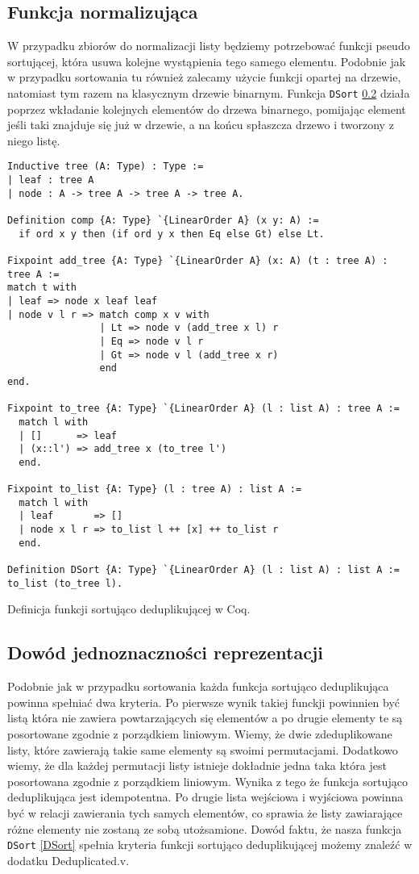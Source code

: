 \subsection{Funkcja normalizująca}
W przypadku zbiorów do normalizacji listy będziemy potrzebować funkcji pseudo sortującej, która usuwa kolejne wystąpienia tego samego elementu. Podobnie jak w przypadku sortowania tu również zalecamy użycie funkcji opartej na drzewie, natomiast tym razem na klasycznym drzewie binarnym.
Funkcja \texttt{DSort} \ref{} działa poprzez wkładanie kolejnych elementów do drzewa binarnego, pomijając element jeśli taki znajduje się już w drzewie, a na końcu spłaszcza drzewo i tworzony z niego listę. 
\begin{code}
\begin{verbatim}
Inductive tree (A: Type) : Type :=
| leaf : tree A
| node : A -> tree A -> tree A -> tree A.

Definition comp {A: Type} `{LinearOrder A} (x y: A) := 
  if ord x y then (if ord y x then Eq else Gt) else Lt.

Fixpoint add_tree {A: Type} `{LinearOrder A} (x: A) (t : tree A) : tree A :=
match t with
| leaf => node x leaf leaf
| node v l r => match comp x v with
                | Lt => node v (add_tree x l) r
                | Eq => node v l r
                | Gt => node v l (add_tree x r)
                end
end.

Fixpoint to_tree {A: Type} `{LinearOrder A} (l : list A) : tree A := 
  match l with
  | []      => leaf
  | (x::l') => add_tree x (to_tree l')
  end.

Fixpoint to_list {A: Type} (l : tree A) : list A := 
  match l with
  | leaf       => []
  | node x l r => to_list l ++ [x] ++ to_list r
  end.

Definition DSort {A: Type} `{LinearOrder A} (l : list A) : list A := to_list (to_tree l).
\end{verbatim}
\caption{Definicja funkcji sortująco deduplikującej w Coq.}
\label{DSort}
\end{code}
\subsection{Dowód jednoznaczności reprezentacji}
Podobnie jak w przypadku sortowania każda funkcja sortująco deduplikująca powinna spełniać dwa kryteria. Po pierwsze wynik takiej funckji powinnien być listą która nie zawiera powtarzających się elementów a po drugie elementy te są posortowane zgodnie z porządkiem liniowym. Wiemy, że dwie zdeduplikowane listy, które zawierają takie same elementy są swoimi permutacjami. Dodatkowo wiemy, że dla każdej permutacji listy istnieje dokładnie jedna taka która jest posortowana zgodnie z porządkiem liniowym. Wynika z tego że funkcja sortująco deduplikująca jest idempotentna. Po drugie lista wejściowa i wyjściowa powinna być w relacji zawierania tych samych elementów, co sprawia że listy zawiarające różne elementy nie zostaną ze sobą utożsamione. Dowód faktu, że nasza funkcja \texttt{DSort} \ref{DSort} spełnia kryteria funkcji sortująco deduplikującej możemy znaleźć w dodatku Deduplicated.v.